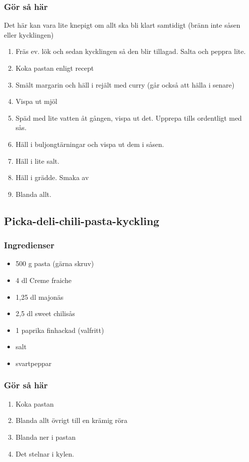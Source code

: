 \documentclass[a4paper,11pt,twocolumn]{article}
\begin{document}
\subsubsection*{Gör så här}
Det här kan vara lite knepigt om allt ska bli klart samtidigt (bränn inte såsen eller kycklingen)
\begin{enumerate}[label=\arabic*.]
    \item Fräs ev. lök och sedan kycklingen så den blir tillagad. Salta och peppra lite.
    \item Koka pastan enligt recept
    \item Smält margarin och häll i rejält med curry (går också att hälla i senare)
    \item Vispa ut mjöl
    \item Späd med lite vatten åt gången, vispa ut det. Upprepa tills ordentligt med sås.
    \item Häll i buljongtärningar och vispa ut dem i såsen.
    \item Häll i lite salt.
    \item Häll i grädde. Smaka av
    \item Blanda allt.
\end{enumerate}




\subsection{Picka-deli-chili-pasta-kyckling}
\subsubsection*{Ingredienser}
\begin{itemize}[noitemsep]
    \item 500 g pasta (gärna skruv)
    \item 4 dl Creme fraiche
    \item 1,25 dl majonäs
    \item 2,5 dl sweet chilisås
    \item 1 paprika finhackad (valfritt)
    \item salt
    \item svartpeppar
\end{itemize}
\subsubsection*{Gör så här}
\begin{enumerate}[label=\arabic*.]
    \item Koka pastan
    \item Blanda allt övrigt till en krämig röra
    \item Blanda ner i pastan
    \item Det stelnar i kylen.
\end{enumerate}
\end{document}
